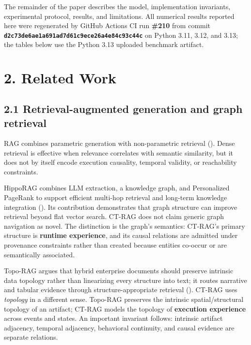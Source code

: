 \documentclass[
  11pt,
]{article}
\begin{document}
The remainder of the paper describes the model, implementation
invariants, experimental protocol, results, and limitations. All
numerical results reported here were regenerated by GitHub Actions CI
run \textbf{\#210} from commit
\textbf{\texttt{d2c73de6ae1a691ad7d61c9ece26a4e84c93c44c}} on Python
3.11, 3.12, and 3.13; the tables below use the Python 3.13 uploaded
benchmark artifact.

\section{2. Related Work}\label{related-work}

\subsection{2.1 Retrieval-augmented generation and graph
retrieval}\label{retrieval-augmented-generation-and-graph-retrieval}

RAG combines parametric generation with non-parametric retrieval
(). Dense retrieval is
effective when relevance correlates with semantic similarity, but it
does not by itself encode execution causality, temporal validity, or
reachability constraints.

HippoRAG combines LLM extraction, a knowledge graph, and Personalized
PageRank to support efficient multi-hop retrieval and long-term
knowledge integration (). Its contribution demonstrates that graph structure can
improve retrieval beyond flat vector search. CT-RAG does not claim
generic graph navigation as novel. The distinction is the graph's
semantics: CT-RAG's primary structure is \textbf{runtime experience},
and its causal relations are admitted under provenance constraints
rather than created because entities co-occur or are semantically
associated.

Topo-RAG argues that hybrid enterprise documents should preserve
intrinsic data topology rather than linearizing every structure into
text; it routes narrative and tabular evidence through
structure-appropriate retrieval
().
CT-RAG uses \emph{topology} in a different sense. Topo-RAG preserves the
intrinsic spatial/structural topology of an artifact; CT-RAG models the
topology of \textbf{execution experience} across events and states. An
important invariant follows: intrinsic artifact adjacency, temporal
adjacency, behavioral continuity, and causal evidence are separate
relations.
\end{document}
